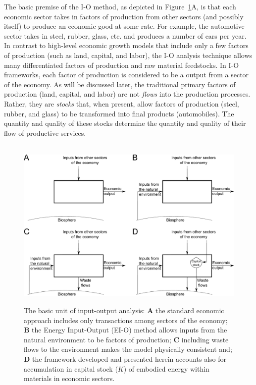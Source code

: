 The basic premise of the I-O method, 
as depicted in Figure~\ref{fig:basic_unit}A, 
is that each economic sector takes in factors of production 
from other sectors (and possibly itself) 
to produce an economic good at some rate. 
For example, the automotive sector takes in steel, rubber, glass, etc. 
and produces a number of cars per year. 
In contrast to high-level economic growth models 
that include only a few factors of production (such as land, capital, and labor), 
the I-O analysis technique allows many differentiated factors of production 
and raw material feedstocks.\cite{Costanza:1980ww} 
In I-O frameworks, each factor of production 
is considered to be a output from a sector of the economy. 
As will be discussed later,
the traditional primary factors of production (land, capital, and labor) 
are not \emph{flows} into the production processes. 
Rather, they are \emph{stocks} that, when present, 
allow factors of production (steel, rubber, and glass) 
to be transformed into final products (automobiles). 
The quantity and quality of these stocks 
determine the quantity and quality of their flow of productive services.

\begin{figure}[!ht]
\centering\
\includegraphics[width=\linewidth]{Part_0/Chapter_Introduction/images/Basic_unit_square.pdf}
\caption[The basic unit of input-output analysis]{The basic unit 
of input-output analysis: 
\textbf{A} the standard economic approach includes only transactions 
among sectors of the economy; 
\textbf{B} the Energy Input-Output (EI-O) method allows inputs 
from the natural environment to be factors of production; 
\textbf{C} including waste flows to the environment makes the model physically consistent and;
\textbf{D} the framework developed and presented herein accounts also for accumulation
in capital stock ($K$) of embodied energy within materials in economic sectors.}
\label{fig:basic_unit}
\end{figure}

